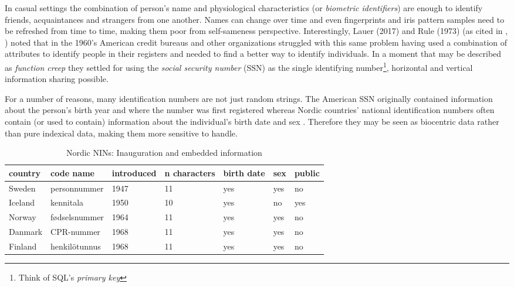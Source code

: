 In casual settings the combination of person's name and physiological characteristics (or \emph{biometric identifiers}) are enough to identify friends, acquaintances and strangers from one another. Names can change over time and even fingerprints and iris pattern samples need to be refreshed from time to time, making them poor from self-sameness perspective. Interestingly, Lauer (2017) and Rule (1973) (as cited in \citeauthor{brensinger2021}, \citeyear[31--32]{brensinger2021}) noted that in the 1960's American credit bureaus and other organizations struggled with this same problem having used a combination of attributes to identify people in their registers and needed to find a better way to identify individuals. In a moment that may be described as \emph{function creep} they settled for using the \emph{social security number} (SSN) as the single identifying number\footnote{Think of SQL's \emph{primary key}}, horizontal and vertical information sharing possible.

For a number of reasons, many identification numbers are not just random strings. The American SSN originally contained information about the person's birth year and where the number was first registered \citep[32]{brensinger2021} whereas Nordic countries' national identification numbers often contain (or used to contain) information about the individual's birth date and sex \citep{watson2010, salste2021}. Therefore they may be seen as biocentric data rather than pure indexical data, making them more sensitive to handle.

\begin{table}[ht]
\centering
\begin{tabular}{lllllll}
\toprule
  country & code name & introduced & n characters & birth date & sex & public \\
  \hline
  Sweden & personnummer & 1947 & 11 & yes & yes & no \\
  Iceland & kennitala & 1950 & 10 & yes & no & yes \\
  Norway & fødselsnummer & 1964 & 11 & yes & yes & no \\
  Danmark & CPR-nummer & 1968 & 11 & yes & yes & no \\
  Finland & henkilötunnus & 1968 & 11 & yes & yes & no \\
\bottomrule
\end{tabular}
\caption{Nordic NINs: Inauguration and embedded information}
\label{tab:nordiccomparison}
\end{table}

